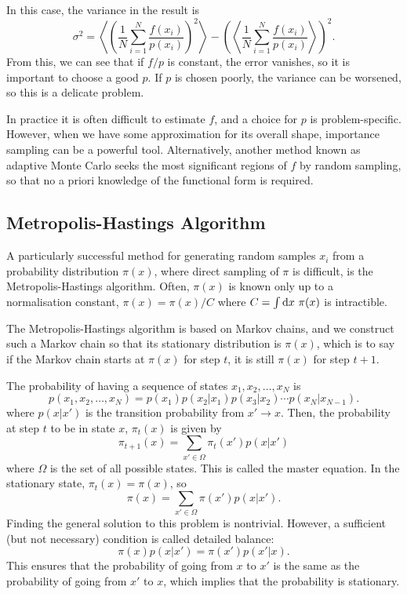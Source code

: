 In this case, the variance in the result is
\begin{equation}
    \sigma^2 = \left\langle \left( \frac{1}{N}\sum^N_{i=1} \frac{f(x_i)}{p(x_i)}\right)^2\right\rangle - \left( \left\langle  \frac{1}{N}\sum^N_{i=1} \frac{f(x_i)}{p(x_i)}\right\rangle\right)^2.
\end{equation}
From this, we can see that if $f/p$ is constant, the error vanishes, so it is important to choose a good $p$. If $p$ is chosen poorly, the variance can be worsened, so this is a delicate problem.

In practice it is often difficult to estimate $f$, and a choice for $p$ is problem-specific. However, when we have some approximation for its overall shape, importance sampling can be a powerful tool. Alternatively, another method known as adaptive Monte Carlo\cite{arounaAdaptative2004} seeks the most significant regions of $f$ by random sampling, so that no a priori knowledge of the functional form is required.

\subsection{Metropolis-Hastings Algorithm}
\label{sec:mcmc}
A particularly successful method for generating random samples $x_i$ from a probability distribution $\pi(x)$, where direct sampling of $\pi$ is difficult, is the Metropolis-Hastings algorithm.\supercite{metropolisEquation1953,hastingsMonte1970} Often, $\pi(x)$ is known only up to a normalisation constant, $\pi(x)=\pi(x)/C$ where $C=\int\mathrm{d} x\ \pi(x)$ is intractible.

The Metropolis-Hastings algorithm is based on Markov chains,\supercite{markovTheory1954} and we construct such a Markov chain so that its stationary distribution is $\pi(x)$, which is to say if the Markov chain starts at $\pi(x)$ for step $t$, it is still $\pi(x)$ for step $t+1$.

The probability of having a sequence of states $x_1,x_2,\ldots,x_N$ is
\begin{equation}
    p(x_1,x_2,\ldots,x_N) = p(x_1)p(x_2|x_1)p(x_3|x_2)\cdots p(x_N|x_{N-1}).
\end{equation}
where $p(x|x')$ is the transition probability from $x'\to x$. Then, the probability at step $t$ to be in state $x$, $\pi_t(x)$ is given by
\begin{equation}
\pi_{t+1}(x) = \sum_{x'\in \Omega} \pi_t(x')p(x|x')
\end{equation}
where $\Omega$ is the set of all possible states. This is called the master equation. In the stationary state, $\pi_t(x)=\pi(x)$, so
\begin{equation}
    \pi(x) = \sum_{x'\in \Omega} \pi(x')p(x|x').
\end{equation}
Finding the general solution to this problem is nontrivial. However, a sufficient (but not necessary) condition is called detailed balance:
\begin{equation}
    \pi(x)p(x|x') = \pi(x')p(x'|x).
\end{equation}
This ensures that the probability of going from $x$ to $x'$ is the same as the probability of going from $x'$ to $x$, which implies that the probability is stationary.

